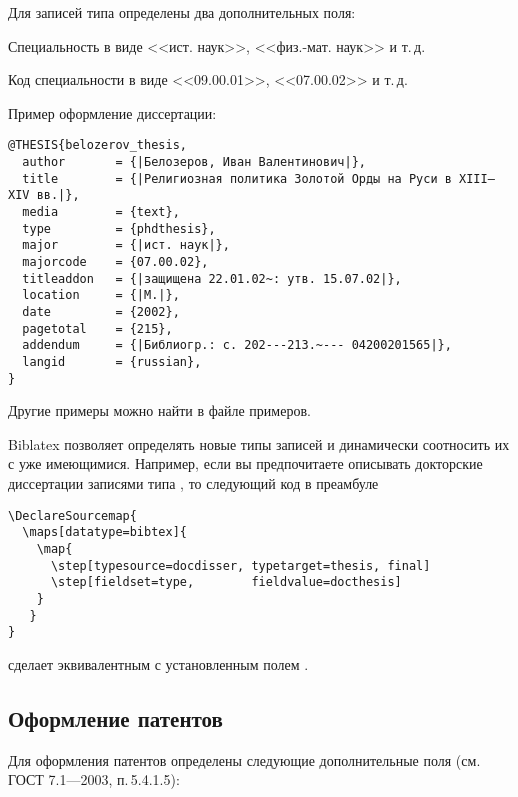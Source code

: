 \documentclass[10pt,a4paper,headings=small,numbers=enddot,english,russian]{ltxdockit}
\newcommand*{\biblatex}{Biblatex\xspace}
\newcommand*{\gostbibname}[1][]{ГОСТ#1 7.1---2003\xspace}
\newcommand*{\gostbibref}[2][]{\gostbibname[#1], п.\,#2\xspace}
\begin{document}
Для записей типа  определены два дополнительных поля:

\begin{fieldlist}


Специальность в виде <<ист. наук>>, <<физ.-мат. наук>> и т.\,д.


Код специальности в виде <<09.00.01>>, <<07.00.02>> и т.\,д.

\end{fieldlist}

Пример оформление диссертации:

\begin{lstlisting}[style=bibtex,escapechar=|]
@THESIS{belozerov_thesis,
  author       = {|Белозеров, Иван Валентинович|},
  title        = {|Религиозная политика Золотой Орды на Руси в XIII—XIV вв.|},
  media        = {text},
  type         = {phdthesis},
  major        = {|ист. наук|},
  majorcode    = {07.00.02},
  titleaddon   = {|защищена 22.01.02~: утв. 15.07.02|},
  location     = {|М.|},
  date         = {2002},
  pagetotal    = {215},
  addendum     = {|Библиогр.: с. 202---213.~--- 04200201565|},
  langid       = {russian},
}
\end{lstlisting}

Другие примеры можно найти в файле примеров.

\biblatex позволяет определять новые типы записей и динамически соотносить их
с уже имеющимися.
Например, если вы предпочитаете описывать докторские диссертации записями типа
, то следующий код в преамбуле

\begin{lstlisting}[style=latex]
\DeclareSourcemap{
  \maps[datatype=bibtex]{
    \map{
      \step[typesource=docdisser, typetarget=thesis, final]
      \step[fieldset=type,        fieldvalue=docthesis]
    }
   }
}
\end{lstlisting}

\noindent сделает  эквивалентным  с установленным полем
.

\subsection{Оформление патентов}
\label{sec:patent}

Для оформления патентов определены следующие дополнительные поля (см. \gostbibref{}{5.4.1.5}):
\end{document}
